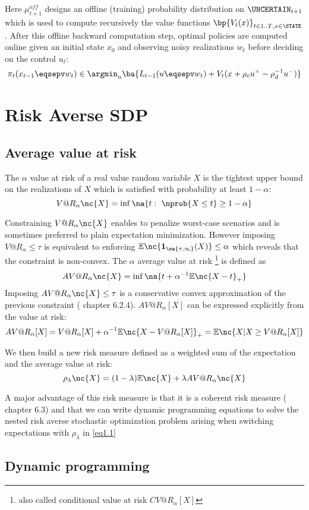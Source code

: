 \documentclass[10pt,a4paper]{article}
\begin{document}
\noindent Here $\mu_{t+1}^{off}$ designs an offline (training) probability distribution on $\UNCERTAIN_{t+1}$ which is used to compute recursively the value functions $\bp{V_t(x)}_{t \in {1..T}, x \in \STATE}$. After this offline backward computation step, optimal policies are computed online given an initial state $x_0$ and observing noisy realizations $w_t$ before deciding on the control $u_t$:
\[ \pi_t(x_{t-1} \eqsepv w_t) \in \argmin_u{\ba{L_{t-1}(u \eqsepv w_t) + V_t(x + \rho_c u^+ - \rho^{-1}_d u^-)}} \]

\section{Risk Averse SDP}

\subsection{Average value at risk}

\noindent The $\alpha$ value at risk of a real value random variable $X$ is the tightest upper bound on the realizations of $X$ which is satisfied with probability at least $1-\alpha$:
\[ V@R_{\alpha}\nc{X} = \inf \na{t: \ \nprob{X \leq t} \geq 1-\alpha } \] 

\noindent Constraining $V@R_\alpha\nc{X}$ enables to penalize worst-case scenarios and is sometimes preferred to plain expectation minimization. However imposing $V@R_\alpha \leq \tau$ is equivalent to enforcing $\mathbb{E}\nc{\boldsymbol{1}_{\na{\tau, \infty}}(X)} \leq \alpha$ which reveals that the constraint is non-convex. The $\alpha$ average value at risk \footnote{also called conditional value at risk $CV@R_\alpha[X]$} is defined as 
\[ AV@R_\alpha\nc{X} = \inf \na{t + \alpha^{-1} \mathbb{E}\nc{X-t}_+ } \]
\noindent Imposing $AV@R_\alpha\nc{X} \leq \tau$ is a conservative convex approximation of the previous constraint (\cite{shapiro2009lectures} chapter 6.2.4). $AV@R_\alpha[X]$ can be expressed explicitly from the value at risk:
\[ AV@R_{\alpha}[X] = V@R_\alpha[X] + \alpha^{-1}\mathbb{E}\nc{X-V@R_\alpha[X]}_+ = \mathbb{E}\nc{X|X \geq V@R_\alpha[X]} \]

\noindent We then build a new risk measure defined as a weighted sum of the expectation and the average value at risk:
\[ \rho_\lambda\nc{X} = (1-\lambda) \mathbb{E}\nc{X} + \lambda AV@R_\alpha\nc{X} \]

\noindent A major advantage of this risk measure is that it is a coherent risk measure (\cite{shapiro2009lectures} chapter 6.3) and that we can write dynamic programming equations to solve the nested risk averse stochastic optimization problem arising when switching expectations with $\rho_\lambda$ in \eqref{eq1.1}

\subsection{Dynamic programming}



\end{document}
